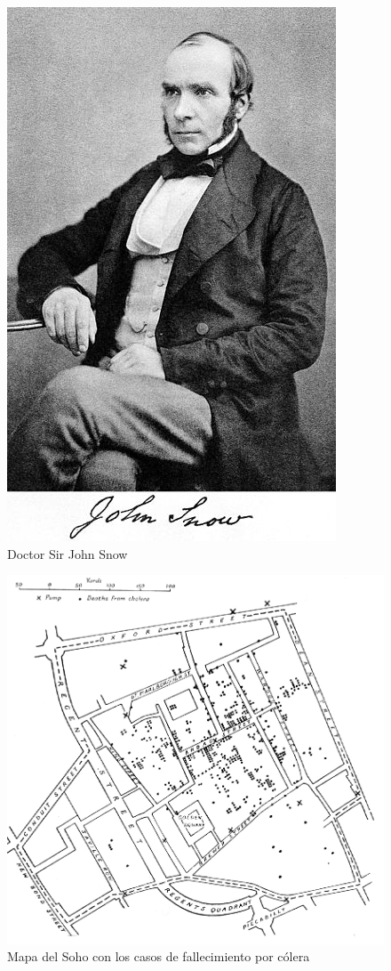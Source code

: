 \begin{figure}[h!btp]
\centering
\includegraphics[scale=1, fbox={\fboxrule} 0mm]{images/03-antecedentes/02-john_snow.jpg}
\caption{Doctor Sir John Snow}
\label{fig:john_snow}
\end{figure}

\begin{figure}[h!btp]
\centering
\includegraphics[scale=0.5, fbox={\fboxrule} 4mm]{images/03-antecedentes/01-cholera_map.jpg}
\caption{Mapa del Soho con los casos de fallecimiento por cólera}
\label{fig:cholera_map}
\end{figure}

